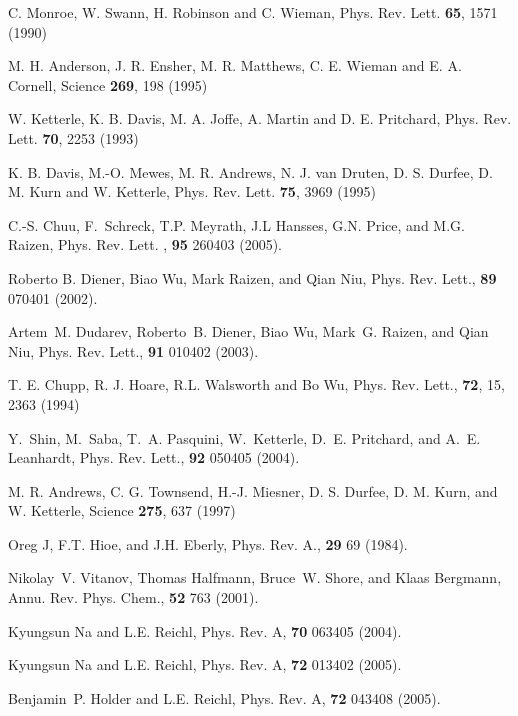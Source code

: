 \documentclass{article}
\begin{document}
%
%
\begin{thebibliography}{99}
%
%

C. Monroe, W. Swann, H. Robinson and C. Wieman, Phys. Rev. Lett. {\bf 65}, 1571 (1990)

M. H. Anderson, J. R. Ensher, M. R. Matthews, C. E. Wieman and E. A. Cornell, Science {\bf 269}, 198 (1995)

W. Ketterle, K. B. Davis, M. A. Joffe, A. Martin and D. E. Pritchard, Phys. Rev. Lett. {\bf 70}, 2253 (1993)

K. B. Davis, M.-O. Mewes, M. R. Andrews, N. J. van Druten, D. S. Durfee, D. M. Kurn and W. Ketterle, Phys. Rev. Lett. {\bf 75}, 3969 (1995)

C.-S. Chuu, F.~Schreck, T.P. Meyrath, J.L Hansses, G.N. Price, and M.G. Raizen, Phys. Rev. Lett. ,
{\bf  95} 260403 (2005).

Roberto B. Diener, Biao Wu, Mark Raizen, and Qian Niu, Phys. Rev. Lett.,  {\bf 89} 070401 (2002).

Artem~M. Dudarev, Roberto~B. Diener, Biao Wu, Mark~G. Raizen, and Qian Niu,  Phys. Rev. Lett., 
{\bf  91} 010402 (2003).

T. E. Chupp, R. J. Hoare, R.L. Walsworth and Bo Wu, Phys. Rev. Lett., {\bf 72}, 15, 2363 (1994)

Y.~Shin, M.~Saba, T.~A. Pasquini, W.~Ketterle, D.~E. Pritchard, and A.~E.
  Leanhardt,  Phys. Rev. Lett., {\bf 92} 050405 (2004).

M. R. Andrews, C. G. Townsend, H.-J. Miesner, D. S. Durfee, D. M. Kurn, and W. Ketterle, Science {\bf 275}, 637 (1997)

Oreg J, F.T. Hioe, and J.H. Eberly, Phys. Rev. A., {\bf 29} 69 (1984).

Nikolay~V. Vitanov, Thomas Halfmann, Bruce~W. Shore, and Klaas Bergmann, 
Annu. Rev. Phys. Chem., {\bf 52} 763 (2001).

Kyungsun Na and L.E. Reichl, Phys. Rev. A, {\bf 70} 063405 (2004).

Kyungsun Na and L.E. Reichl,  Phys. Rev. A, {\bf 72} 013402 (2005).

Benjamin~P. Holder and L.E. Reichl,  Phys. Rev. A, {\bf 72} 043408 (2005).


\end{thebibliography}
\end{document}
